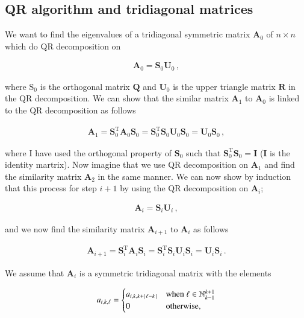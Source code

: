 \documentclass[11pt,english,a4paper]{article}
\begin{document}
\begin{flushleft}
\subsection{QR algorithm and tridiagonal matrices}

We want to find the eigenvalues of a tridiagonal symmetric matrix $\textbf{A}_0$ of $n\times n$ which do QR decomposition on

\begin{align*}
\textbf{A}_0 = \textbf{S}_0\textbf{U}_0 \,,
\end{align*}

where $\text{S}_0$ is the orthogonal matrix $\textbf{Q}$ and $\textbf{U}_0$ is the upper triangle matrix $\textbf{R}$ in the QR decomposition. We can show that the similar matrix $\textbf{A}_1$ to $\textbf{A}_0$ is linked to the QR decomposition as follows

\begin{align*}
\textbf{A}_1 = \textbf{S}_0^{\text{T}} \textbf{A}_0 \textbf{S}_0 
=\textbf{S}_0^{\text{T}} \textbf{S}_0\textbf{U}_0 \textbf{S}_0 = \textbf{U}_0 \textbf{S}_0 \,,
\end{align*}

where I have used the orthogonal property of $\textbf{S}_0$ such that $\textbf{S}_0^{\text{T}} \textbf{S}_0 = \textbf{I}$ ($\textbf{I}$ is the identity martrix). Now imagine that we use QR decomposition on $\textbf{A}_1$ and find the similarity matrix $\textbf{A}_2$ in the same manner. We can now show by induction that this process for step $i+1$ by using the QR decomposition on $\textbf{A}_i$;

\begin{align*}
\textbf{A}_i = \textbf{S}_i \textbf{U}_i \,,
\end{align*}

and we now find the similarity matrix $\textbf{A}_{i+1}$ to $\textbf{A}_i$ as follows

\begin{align*}
\textbf{A}_{i+1} = \textbf{S}_i^{\text{T}} \textbf{A}_i \textbf{S}_i 
=\textbf{S}_i^{\text{T}} \textbf{S}_i\textbf{U}_i \textbf{S}_i = \textbf{U}_i \textbf{S}_i \,.
\end{align*}

We assume that $\textbf{A}_i$ is a symmetric tridiagonal matrix with the elements 

\begin{align*}
a_{i,k,\ell} = \begin{cases} a_{i,k,k+\left\vert{\,\ell-k\,}\right\vert} & \text{when } \ell \in \mathbb{N}_{k-1}^{k+1} \\ 0 & \text{otherwise,}\end{cases}
\end{align*}


\end{flushleft}
\end{document}
